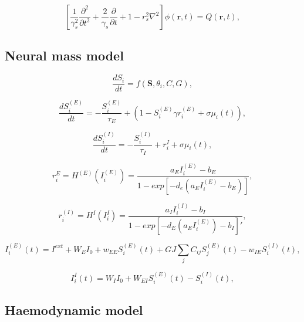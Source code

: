 \documentclass[sn-mathphys-num]{sn-jnl}%
\theoremstyle{thmstyleone}%
\theoremstyle{thmstyletwo}%
\theoremstyle{thmstylethree}%
\begin{document}
\begin{equation}\label{eq:NFT_wave_model}
	[\frac{1}{\gamma_s^2} \frac{\partial ^2}{\partial t^2} + 
	\frac{2}{\gamma_s} \frac{\partial}{\partial t} + 1 - r_s^2 \nabla^2] 
	\phi(\textbf{r}, t) = Q(\textbf{r}, t),
\end{equation}


\subsection{Neural mass model} \label{sec:neural_mass} 


\begin{equation}\label{eq:temporal_activity}
	\frac{dS_i}{dt} = f(\boldsymbol{S}, \theta_i, C, G), 
\end{equation}


\begin{equation}\label{eq:synaptic_gating_E}
	\frac{dS_i^{(E)}}{dt} = - \frac{S_i^{(E)}}{\tau_E} + (1-S_i^{(E)} \gamma r_i^(E) + \sigma \mu_i(t)),
\end{equation}

\begin{equation}\label{eq:synaptic_gating_I}
	\frac{dS_i^{(I)}}{dt} = - \frac{S_i^{(I)}}{\tau_I} + r_i^{I} + \sigma \mu_i(t),
\end{equation}

\begin{equation}\label{eq:firing_rate_E}
	r_i^{E} = H^{(E)} (I_i^{(E)}) = \frac{a_E I_i^{(E)} - b_E}{1 - exp[-d_e (a_E I_i^{(E)} - b_E)]},
\end{equation}

\begin{equation}\label{eq:firing_rate_I}
	r_i^{(I)} = H^{I} (I_i^{I}) = \frac{a_I I_i^{(I)} - b_I}{1 - exp[-d_E (a_E I_i^{(E)}) - b_I]'},
\end{equation}

\begin{equation}\label{eq:input_current_E}
	I_i^{(E)}(t) = I^{ext} + W_E I_0 + w_{EE} S_i^{(E)} (t) + G J \sum_j C_{ij} S_j^{(E)}(t) - w_{IE} S_i^{(I)} (t), 
\end{equation}

\begin{equation}\label{eq:input_current_I}
	I_i^{I} (t) = W_I I_0 +
	W_{EI} S_i^{(E)} (t) - 
	S_i^{(I)} (t),
\end{equation}


\subsection{Haemodynamic model} \label{sec:haemodynamic_model}
\end{document}
